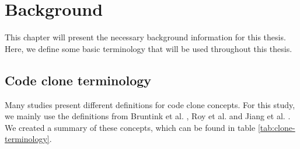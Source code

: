 \chapter{Background}
\label{ch:background}
This chapter will present the necessary background information for this thesis. Here, we define some basic terminology that will be used throughout this thesis.

\section{Code clone terminology}\label{sec:terminology}
Many studies present different definitions for code clone concepts. For this study, we mainly use the definitions from Bruntink et al. \cite{bruntink2005use}, Roy et al. \cite{roy2007survey} and Jiang et al. \cite{jiang2007deckard}. We created a summary of these concepts, which can be found in table \ref{tab:clone-terminology}.

